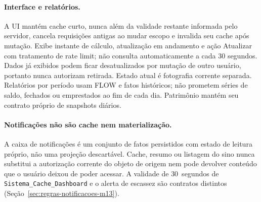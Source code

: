 \paragraph{Interface e relatórios.}
A UI mantém cache curto, nunca além da validade restante informada pelo servidor, cancela requisições antigas ao mudar escopo e invalida seu cache após mutação. Exibe instante de cálculo, atualização em andamento e ação Atualizar com tratamento de rate limit; não consulta automaticamente a cada 30 segundos. Dados já exibidos podem ficar desatualizados por mutação de outro usuário, portanto nunca autorizam retirada. Estado atual é fotografia corrente separada. Relatórios por período usam FLOW e fatos históricos; não prometem séries de saldo, fechados ou emprestados ao fim de cada dia. Patrimônio mantém seu contrato próprio de snapshots diários.

\paragraph{Notificações não são cache nem materialização.}
A caixa de notificações é um conjunto de fatos persistidos com estado de leitura
próprio, não uma projeção descartável. Cache, resumo ou listagem do sino nunca
substitui a autorização corrente do objeto de origem nem pode devolver conteúdo
que o usuário deixou de poder acessar. A validade de $30$~segundos de
\texttt{Sistema\_Cache\_Dashboard} e o alerta de escassez são contratos
distintos (Seção~\ref{sec:regras-notificacoes-m13}).

